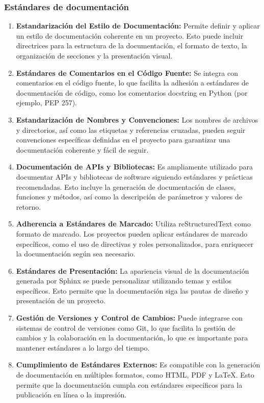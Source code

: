 \documentclass[letterpaper]{article}
\begin{document}
\subsubsection{Estándares de documentación}
\begin{enumerate}[series=listWWNumxvi,label=\arabic*.,ref=\arabic*]
\item \textbf{Estandarización del Estilo de Documentación:} Permite definir y aplicar un estilo de documentación
coherente en un proyecto. Esto puede incluir directrices para la estructura de la documentación, el formato de texto,
la organización de secciones y la presentación visual.
\item \textbf{Estándares de Comentarios en el Código Fuente:} Se integra con comentarios en el código fuente, lo que
facilita la adhesión a estándares de documentación de código, como los comentarios docstring en Python (por ejemplo,
PEP 257).
\item \textbf{Estandarización de Nombres y Convenciones:} Los nombres de archivos y directorios, así como las etiquetas
y referencias cruzadas, pueden seguir convenciones específicas definidas en el proyecto para garantizar una
documentación coherente y fácil de seguir.
\item \textbf{Documentación de APIs y Bibliotecas:} Es ampliamente utilizado para documentar APIs y bibliotecas de
software siguiendo estándares y prácticas recomendadas. Esto incluye la generación de documentación de clases,
funciones y métodos, así como la descripción de parámetros y valores de retorno.
\item \textbf{Adherencia a Estándares de Marcado:} Utiliza reStructuredText como formato de marcado. Los proyectos
pueden aplicar estándares de marcado específicos, como el uso de directivas y roles personalizados, para enriquecer la
documentación según sea necesario.
\item \textbf{Estándares de Presentación:} La apariencia visual de la documentación generada por Sphinx se puede
personalizar utilizando temas y estilos específicos. Esto permite que la documentación siga las pautas de diseño y
presentación de un proyecto.
\item \textbf{Gestión de Versiones y Control de Cambios:} Puede integrarse con sistemas de control de versiones como
Git, lo que facilita la gestión de cambios y la colaboración en la documentación, lo que es importante para mantener
estándares a lo largo del tiempo.
\item \textbf{Cumplimiento de Estándares Externos:} Es compatible con la generación de documentación en múltiples
formatos, como HTML, PDF y LaTeX. Esto permite que la documentación cumpla con estándares específicos para la
publicación en línea o la impresión.
\end{enumerate}
\end{document}
